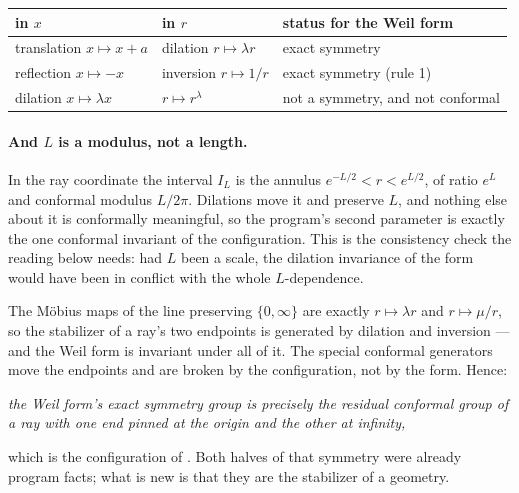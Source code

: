 \begin{center}
\begin{tabular}{@{}lll@{}}
\toprule
in $x$ & in $r$ & status for the Weil form\\
\midrule
translation $x\mapsto x+a$ & dilation $r\mapsto\lambda r$ & exact symmetry\\
reflection $x\mapsto-x$ & inversion $r\mapsto1/r$ & exact symmetry (rule 1)\\
dilation $x\mapsto\lambda x$ & $r\mapsto r^\lambda$ & not a symmetry, and not conformal\\
\bottomrule
\end{tabular}
\end{center}

\paragraph{And $L$ is a modulus, not a length.} In the ray coordinate the
interval $I_L$ is the annulus $e^{-L/2}<r<e^{L/2}$, of ratio $e^L$ and conformal
modulus $L/2\pi$. Dilations move it and preserve $L$, and nothing else about it is
conformally meaningful, so the program's second parameter is exactly the one
conformal invariant of the configuration. This is the consistency check the
reading below needs: had $L$ been a scale, the dilation invariance of the form
would have been in conflict with the whole $L$-dependence.

The Möbius maps of the line preserving $\{0,\infty\}$ are exactly
$r\mapsto\lambda r$ and $r\mapsto\mu/r$, so the stabilizer of a ray's two
endpoints is generated by dilation and inversion --- and the Weil form is
invariant under all of it. The special conformal generators move the endpoints
and are broken by the configuration, not by the form. Hence:

\begin{center}
\emph{the Weil form's exact symmetry group is precisely the residual conformal
group of a ray with one end pinned at the origin and the other at infinity,}
\end{center}

which is the configuration of \cite{OWL}. Both halves of that symmetry were
already program facts; what is new is that they are the stabilizer of a geometry.

